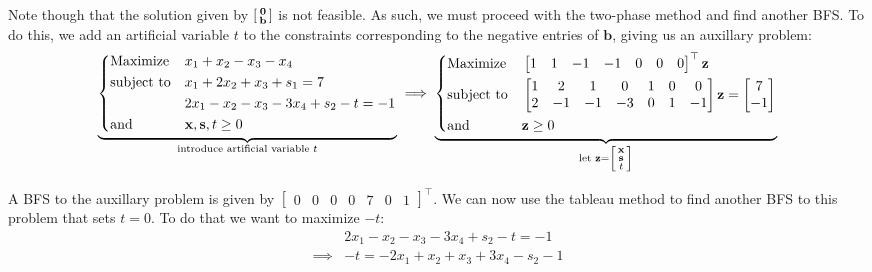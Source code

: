 \documentclass{article}
\newcommand{\icol}[1]{%
  \begin{bsmallmatrix}#1\end{bsmallmatrix}%
}
\renewcommand\vec{\mathbf}
\begin{document}
Note though that the solution given by $\icol{\vec 0\\\vec b}$ is not feasible. As such, we must proceed with the two-phase method and find another BFS. To do this, we add an artificial variable $t$ to the constraints corresponding to the negative entries of $\vec b$, giving us an auxillary problem:
\begin{align*}
    \underbrace{\left\{\begin{aligned}
        &{\text{Maximize}}
        &&x_1+x_2-x_3-x_4\\
        &{\text{subject to}}
        &&x_1+2x_2+x_3+s_1=7\\
        &
        &&2x_1-x_2-x_3-3x_4+s_2-t=-1\\
        &{\text{and}}
        &&\vec x,\vec s, t\ge 0
    \end{aligned}\right.}_{\text{introduce artificial variable }t}
    \implies
    \underbrace{\left\{\begin{aligned}
        &{\text{Maximize}}
        &&\begin{bmatrix}
            1&1&-1&-1&0&0&0
        \end{bmatrix}^\top\vec z\\
        &{\text{subject to}}
        &&\begin{bmatrix}
            1&2&1&0&1&0&0\\
            2&-1&-1&-3&0&1&-1
        \end{bmatrix}\vec z=\begin{bmatrix}
            7\\-1
        \end{bmatrix}\\
        &{\text{and}}
        &&\vec z\ge 0
    \end{aligned}\right.}_{\text{let }\vec z=\icol{\vec x\\\vec s\\t}}
\end{align*}

A BFS to the auxillary problem is given by $\begin{bmatrix}
    0&0&0&0&7&0&1
\end{bmatrix}^\top$. We can now use the tableau method to find another BFS to this problem that sets $t=0$. To do that we want to maximize $-t$:
\begin{align*}
    &2x_1-x_2-x_3-3x_4+s_2-t=-1\\
    \implies&-t=-2x_1+x_2+x_3+3x_4-s_2-1
\end{align*}
\end{document}
